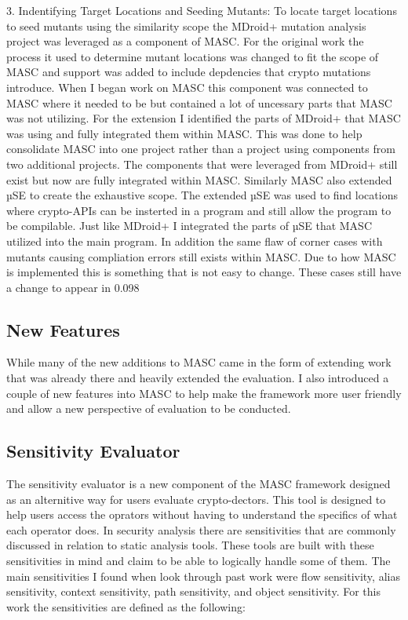 3. Indentifying Target Locations and Seeding Mutants: To locate target locations to seed mutants using the similarity scope the MDroid+ mutation analysis project was leveraged as a component of MASC. For the original work the process it used to determine mutant locations was changed to fit the scope of MASC and  support was added to include depdencies that crypto mutations introduce. When I began work on MASC this component was connected to MASC where it needed to be but contained a lot of uncessary parts that MASC was not utilizing. For the extension I identified the parts of MDroid+ that MASC was using and fully integrated them within MASC. This was done to help consolidate MASC into one project rather than a project using components from two additional projects. The components that were leveraged from MDroid+ still exist but now are fully integrated within MASC.
Similarly MASC also extended µSE to create the exhaustive scope. The extended µSE was used to find locations where crypto-APIs can be insterted in a program and still allow the program to be compilable. Just like MDroid+ I integrated the parts of µSE that MASC utilized into the main program. 
In addition the same flaw of corner cases with mutants causing compliation errors still exists within MASC. Due to how MASC is implemented this is something that is not easy to change. These cases still have a change to appear in 0.098%


\subsection{New Features}
\label{ch3:sec:new-features}

While many of the new additions to MASC came in the form of extending work that was already there and heavily extended the evaluation. I also introduced a couple of new features into MASC to help make the framework more user friendly and allow a new perspective of evaluation to be conducted.

\subsection{Sensitivity Evaluator}
\label{ch3:subsec:sensitities}

The sensitivity evaluator is a new component of the MASC framework designed as an alternitive way for users evaluate crypto-dectors. This tool is designed to help users access the oprators without having to understand the specifics of what each operator does. In security analysis there are sensitivities that are commonly discussed in relation to static analysis tools. These tools are built with these sensitivities in mind and claim to be able to logically handle some of them. The main sensitivities I found when look through past work were flow sensitivity, alias sensitivity, context sensitivity, path sensitivity, and object sensitivity. For this work the sensitivities are defined as the following:

